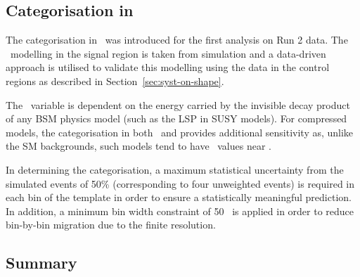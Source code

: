 
\subsection{Categorisation in \mht}
\label{sec:cat-mht}
The categorisation in \mht~was introduced for the first analysis on
Run 2 data. The \mht~modelling in the signal region is taken from 
simulation and a data-driven approach is utilised to validate 
this modelling using the data in the control regions as described 
in Section~\ref{sec:syst-on-shape}.

The \mht~variable is dependent on the energy carried by
the invisible decay product of any BSM physics model (such as the
LSP in SUSY models). For compressed
models, the categorisation in both \scalht~and \mht provides additional 
sensitivity as, unlike the SM backgrounds, such models tend to 
have \mht~values near \scalht. 

In determining the categorisation, a maximum statistical uncertainty from the 
simulated events of 50\% (corresponding to four unweighted events) 
is required in each bin of the template in order to ensure a statistically meaningful prediction. 
In addition, a minimum bin width constraint of 50 \GeV~is applied in order to reduce bin-by-bin migration 
due to the finite \mht resolution.

\subsection{Summary}

